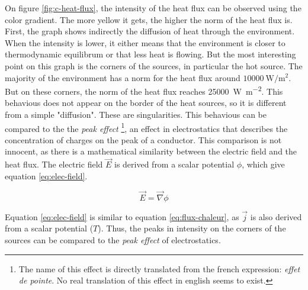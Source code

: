 \documentclass[a4paper,12pt,twoside]{article}
\begin{document}
On figure \ref{fig:c-heat-flux}, the intensity of the heat flux can be observed using the color gradient.
The more yellow it gets, the higher the norm of the heat flux is. %
First, the graph shows indirectly the diffusion of heat through the environment.
When the intensity is lower, it either means that the environment is closer to thermodynamic equilibrum or that less heat is flowing. %
But the most interesting point on this graph is the corners of the sources, in particular the hot source.
The majority of the environment has a norm for the heat flux around $\SI{10000}{\watt\per\square\meter}$. But on these corners, the norm of the heat flux reaches \SI{25000}{\watt\per\square\meter}.
This behavious does not appear on the border of the heat sources, so it is different from a simple "diffusion".
These are singularities. %
This behavious can be compared to the the \textit{peak effect} \footnote{The name of this effect is directly translated from the french expression: \textit{effet de pointe}. No real translation of this effect in english seems to exist.}, an effect in electrostatics that describes the concentration of charges on the peak of a conductor.
This comparison is not innocent, as there is a mathematical similarity between the electric field and the heat flux.
The electric field $\vec{E}$ is derived from a scalar potential $\phi$, which give equation \eqref{eq:elec-field}.

\begin{equation}
  \vec{E} = \vec{\nabla}\phi
  \label{eq:elec-field}
\end{equation}

Equation \eqref{eq:elec-field} is similar to equation \eqref{eq:flux-chaleur}, as $\vec{j}$ is also derived from a scalar potential ($T$). %
Thus, the peaks in intensity on the corners of the sources can be compared to the \textit{peak effect} of electrostatics.
\end{document}
